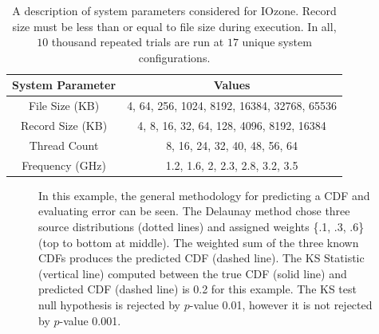 \documentclass[letterpaper, 10 pt, conference]{ieeeconf}  %
\begin{document}
\begin{table}
  \centering
  \begin{tabular}{c|c}
    \hline
    \textbf{System Parameter} & \textbf{Values}\\
    \hline
    File Size (KB) & 4, 64, 256, 1024, 8192, 16384, 32768, 65536\\
    \hline
    Record Size (KB) & 4, 8, 16, 32, 64, 128, 4096, 8192, 16384\\
    \hline
    Thread Count & 8, 16, 24, 32, 40, 48, 56, 64\\
    \hline
    Frequency (GHz) & 1.2, 1.6, 2, 2.3, 2.8, 3.2, 3.5\\
    \hline
  \end{tabular}
  \caption{A description of system parameters considered for IOzone. Record size must be less than or equal to file size during execution. In all, $10$ thousand repeated trials are run at $17$ unique system configurations.
    \vspace{-.5cm}}
  \label{tab:data_description}
\end{table}


\begin{figure}
  \vspace{-0.3cm}
  \caption{In this example, the general methodology for predicting a CDF and evaluating error can be seen. The Delaunay method chose three source distributions (dotted lines) and assigned weights \{.1, .3, .6\} (top to bottom at middle). The weighted sum of the three known CDFs produces the predicted CDF (dashed line). The KS Statistic (vertical line) computed between the true CDF (solid line) and predicted CDF (dashed line) is 0.2 for this example. The KS test null hypothesis is rejected by $p$-value 0.01, however it is not rejected by $p$-value 0.001.
  \vspace{-.1cm}}
  \label{fig:prediction-example}
\end{figure}
\end{document}
